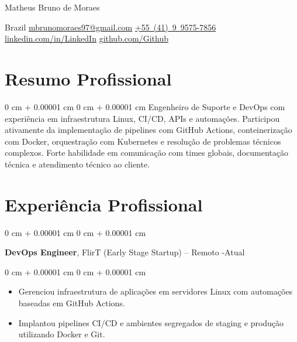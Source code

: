 \documentclass[10pt, letterpaper]{article}
\newenvironment{highlights}{
    \begin{itemize}[
        topsep=0.10 cm,
        parsep=0.10 cm,
        partopsep=0pt,
        itemsep=0pt,
        leftmargin=0 cm + 10pt
    ]
}{
    \end{itemize}
}
\newenvironment{onecolentry}{
    \begin{adjustwidth}{
        0 cm + 0.00001 cm
    }{
        0 cm + 0.00001 cm
    }
}{
    \end{adjustwidth}
}
\newenvironment{header}{
    \setlength{\topsep}{0pt}\par\kern\topsep\centering\linespread{1.5}
}{
    \par\kern\topsep
}
\begin{document}
    \begin{header}
        {\fontsize{25pt}{25pt}\selectfont Matheus Bruno de Moraes}

        \vspace{5pt}

        \normalsize
        \mbox{Brazil} \textbar{} \mbox{\href{mailto:mbrunomoraes97@gmail.com}{mbrunomoraes97@gmail.com}} \textbar{} \mbox{\href{tel:+55(41)995757856}{+55 (41) 9 9575-7856}} \textbar{} \mbox{\href{https://linkedin.com/in/LinkedIn}{linkedin.com/in/LinkedIn}} \textbar{} \mbox{\href{https://github.com/Github}{github.com/Github}} \textbar{} \mbox{\href{https://}{}}
    \end{header}

    \vspace{5pt - 0.3cm}
    
\section{Resumo Profissional}
\begin{onecolentry}Engenheiro de Suporte e DevOps com experiência em infraestrutura Linux, CI/CD, APIs e automações. Participou ativamente da implementação de pipelines com GitHub Actions, conteinerização com Docker, orquestração com Kubernetes e resolução de problemas técnicos complexos. Forte habilidade em comunicação com times globais, documentação técnica e atendimento técnico ao cliente.\end{onecolentry}
\section{Experiência Profissional}

    \begin{onecolentry}
        \setcolumnwidth{\fill, 4.5cm}
        \begin{paracol}{2}
            \textbf{DevOps Engineer}, FlirT (Early Stage Startup) -- Remoto
            \switchcolumn
            -Atual
        \end{paracol}
    \end{onecolentry}
    \vspace{0.10cm}
    \begin{onecolentry}
        \begin{highlights}
                    \item Gerenciou infraestrutura de aplicações em servidores Linux com automações baseadas em GitHub Actions.
                \item Implantou pipelines CI/CD e ambientes segregados de staging e produção utilizando Docker e Git.
        \end{highlights}
    \end{onecolentry}
    
\end{document}
